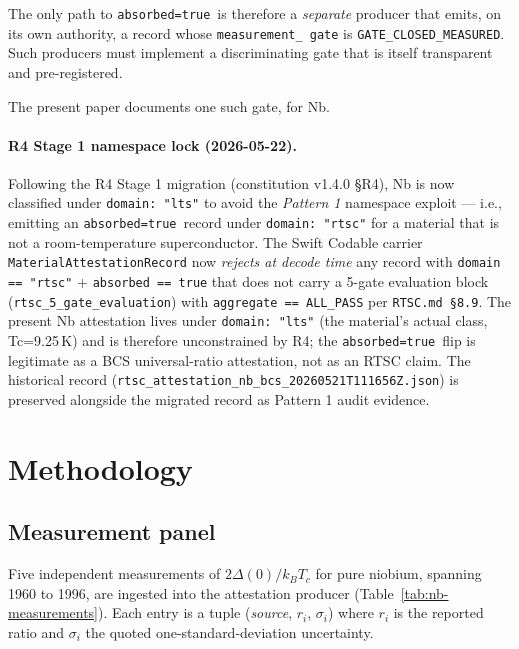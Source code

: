 \documentclass[11pt,a4paper]{article}
\newcommand{\absorbedtrue}{\textcolor{honestgreen}{\texttt{absorbed=true}}}
\newcommand{\gateclosedmeas}{\texttt{GATE\_CLOSED\_MEASURED}}
\begin{document}
The only path to \absorbedtrue\ is therefore a \emph{separate} producer
that emits, on its own authority, a record whose \texttt{measurement\_
gate} is \gateclosedmeas. Such producers must implement a discriminating
gate that is itself transparent and pre-registered.

The present paper documents one such gate, for Nb.

\paragraph{R4 Stage 1 namespace lock (2026-05-22).}
Following the R4 Stage 1 migration (constitution v1.4.0 \S R4),
Nb is now classified under \texttt{domain: "lts"} to avoid the
\emph{Pattern 1} namespace exploit --- i.e., emitting an
\absorbedtrue\ record under \texttt{domain: "rtsc"} for a material
that is not a room-temperature superconductor. The Swift Codable
carrier \texttt{MaterialAttestationRecord} now \emph{rejects at
decode time} any record with \texttt{domain == "rtsc"} +
\texttt{absorbed == true} that does not carry a 5-gate evaluation
block (\texttt{rtsc\_5\_gate\_evaluation}) with
\texttt{aggregate == ALL\_PASS} per \texttt{RTSC.md \S 8.9}. The
present Nb attestation lives under \texttt{domain: "lts"} (the
material's actual class, Tc=9.25\,K) and is therefore unconstrained
by R4; the \absorbedtrue\ flip is legitimate as a BCS universal-ratio
attestation, not as an RTSC claim. The historical record
(\texttt{rtsc\_attestation\_nb\_bcs\_20260521T111656Z.json}) is
preserved alongside the migrated record as Pattern 1 audit evidence.

\section{Methodology}
\label{sec:method}

\subsection{Measurement panel}

Five independent measurements of \(2\Delta(0)/k_{B}T_{c}\) for pure
niobium, spanning 1960 to 1996, are ingested into the attestation
producer (Table~\ref{tab:nb-measurements}). Each entry is a tuple
(\textit{source}, \(r_{i}\), \(\sigma_{i}\)) where \(r_{i}\) is the
reported ratio and \(\sigma_{i}\) the quoted one-standard-deviation
uncertainty.
\end{document}
